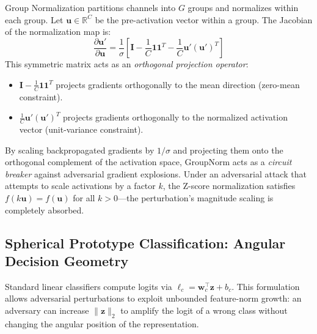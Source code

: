 \documentclass[12pt,a4paper]{article}
\begin{document}
Group Normalization partitions channels into $G$ groups and normalizes
within each group. Let $\mathbf{u} \in \mathbb{R}^C$ be the pre-activation
vector within a group. The Jacobian of the normalization map is:
\begin{equation}
  \frac{\partial \mathbf{u}'}{\partial \mathbf{u}} = \frac{1}{\sigma}
  \left[ \mathbf{I} - \frac{1}{C} \mathbf{1}\mathbf{1}^T
  - \frac{1}{C} \mathbf{u}'(\mathbf{u}')^T \right]
\end{equation}
This symmetric matrix acts as an \textit{orthogonal projection operator}:
\begin{itemize}[leftmargin=1.5em]
  \item $\mathbf{I} - \frac{1}{C}\mathbf{1}\mathbf{1}^T$ projects gradients
        orthogonally to the mean direction (zero-mean constraint).
  \item $\frac{1}{C}\mathbf{u}'(\mathbf{u}')^T$ projects gradients
        orthogonally to the normalized activation vector (unit-variance
        constraint).
\end{itemize}

By scaling backpropagated gradients by $1/\sigma$ and projecting them onto
the orthogonal complement of the activation space, GroupNorm acts as a
\textit{circuit breaker} against adversarial gradient explosions. Under an
adversarial attack that attempts to scale activations by a factor $k$, the
Z-score normalization satisfies $f(k\mathbf{u}) = f(\mathbf{u})$ for all
$k > 0$---the perturbation's magnitude scaling is completely absorbed.

\subsection{Spherical Prototype Classification: Angular Decision Geometry}
\label{sec:spherical}

Standard linear classifiers compute logits via
$\ell_c = \mathbf{w}_c^\top \mathbf{z} + b_c$. This formulation allows
adversarial perturbations to exploit unbounded feature-norm growth: an
adversary can increase $\|\mathbf{z}\|_2$ to amplify the logit of a wrong
class without changing the angular position of the representation.
\end{document}
